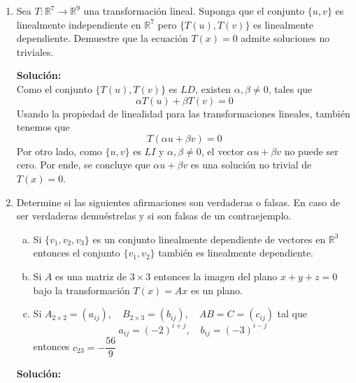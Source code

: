 \documentclass[12pt]{article}
\newenvironment{solucion}
{\begin{mdframed}[backgroundcolor=black!10]
		{\bf Solución:}\\
	}
	{
	\end{mdframed}
}
\newenvironment{preguntas}
{\begin{enumerate}\itemsep12pt
	}
	{
	\end{enumerate}
}
\newcommand{\ra}{\rightarrow}
\newcommand{\R}{\mathbb{R}}
\begin{document}
\begin{preguntas}
\begin{solucion}
		En resumen, las condiciones son
		$$a \neq 0, \quad a \neq 1$$
\end{solucion}
\item Sea $T: \R^7 \ra \R^9$ una transformación lineal. Suponga que el conjunto $\{u,v\}$ es linealmente independiente en $\R^7$ pero $\{T(u), T(v)\}$ es linealmente dependiente. Demuestre que la ecuación $T(x)=0$ admite soluciones no triviales.
\begin{solucion}
Como el conjunto $\{T(u), T(v)\}$ es $LD$, existen $\alpha, \beta \neq 0$, tales que 
$$\alpha T(u) + \beta T(v) = 0$$
Usando la propiedad de linealidad para las transformaciones lineales, también tenemos que
$$ T(\alpha u +\beta v) = 0$$
Por otro lado, como $\{u, v\}$ es $LI$ y $\alpha, \beta \neq 0$, el vector $\alpha u +\beta v$ no puede ser cero. Por ende, se concluye que $\alpha u +\beta v$ es una solución no trivial de $T(x) = 0$.
\end{solucion}
\item Determine si las siguientes afirmaciones son verdaderas o falsas. En caso de ser verdaderas demuéstrelas y si son falsas de un contraejemplo.
\begin{enumerate}[a)]
\item Si $\{v_1, v_2, v_3\}$ es un conjunto linealmente dependiente de vectores en $\R^3$ entonces el conjunto $\{v_1, v_2\}$ también es linealmente dependiente.
\item Si $A$ es una matriz de $3 \times 3$ entonces la imagen del plano $x+y+z=0$ bajo la transformación $T(x)=Ax$ es un plano.
\item Si $A_{2\times 2} = (a_{ij}), \quad B_{2\times 3} = (b_{ij}), \quad AB = C = (c_{ij})$ tal que
$$a_{ij} = (-2)^{i+j}, \quad b_{ij} = (-3)^{i-j}$$
entonces $c_{23} = -\dfrac{56}{9}$
\end{enumerate}
\begin{solucion}


\end{solucion}
\end{preguntas}
\end{document}
